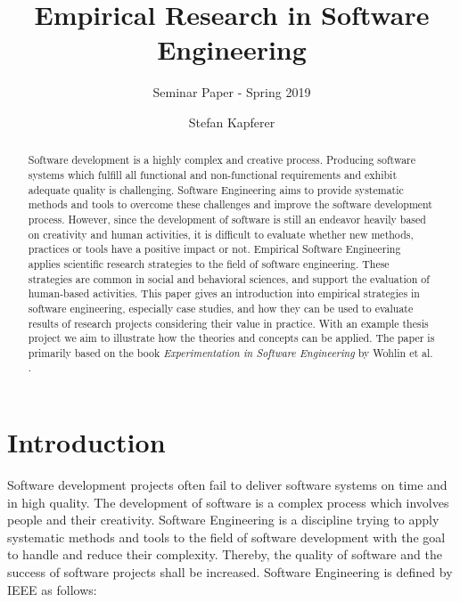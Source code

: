 \documentclass[runningheads]{llncs}
\begin{document}
\title{Empirical Research in Software Engineering}
\subtitle{Seminar Paper - Spring 2019}
\author{Stefan Kapferer}

\maketitle

\begin{abstract}
Software development is a highly complex and creative process. Producing software systems which fulfill all functional and non-functional requirements and exhibit adequate quality is challenging. Software Engineering aims to provide systematic methods and tools to overcome these challenges and improve the software development process. However, since the development of software is still an endeavor heavily based on creativity and human activities, it is difficult to evaluate whether new methods, practices or tools have a positive impact or not. Empirical Software Engineering applies scientific research strategies to the field of software engineering. These strategies are common in social and behavioral sciences, and support the evaluation of human-based activities. This paper gives an introduction into empirical strategies in software engineering, especially case studies, and how they can be used to evaluate results of research projects considering their value in practice. With an example thesis project we aim to illustrate how the theories and concepts can be applied. The paper is primarily based on the book \textit{Experimentation in Software Engineering} by Wohlin et al. \cite{Wohlin:2012:ESE:2349018}.

\end{abstract}


\section{Introduction}
Software development projects often fail to deliver software systems on time and in high quality. The development of software is a complex process which involves people and their creativity. Software Engineering is a discipline trying to apply systematic methods and tools to the field of software development with the goal to handle and reduce their complexity. Thereby, the quality of software and the success of software projects shall be increased. Software Engineering is defined by IEEE \cite{159342} as follows:
\end{document}
